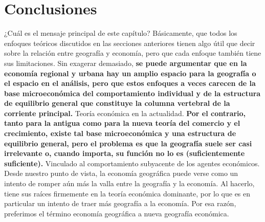 \section{Conclusiones}
¿Cuál es el mensaje principal de este capítulo? Básicamente, que todos los enfoques teóricos discutidos en las secciones anteriores tienen algo útil que decir sobre la relación entre geografía y economía, pero que cada enfoque también tiene sus limitaciones. Sin exagerar demasiado, \textbf{se puede argumentar que en la economía regional y urbana hay un amplio espacio para la geografía o el espacio en el análisis, pero que estos enfoques a veces carecen de la base microeconómica del comportamiento individual y de la estructura de equilibrio general que constituye la columna vertebral de la corriente principal.} Teoría económica en la actualidad. \textbf{Por el contrario, tanto para la antigua como para la nueva teoría del comercio y el crecimiento, existe tal base microeconómica y una estructura de equilibrio general, pero el problema es que la geografía suele ser casi irrelevante o, cuando importa, su función no lo es (suficientemente suficiente).}  Vinculado al comportamiento subyacente de los agentes económicos. Desde nuestro punto de vista, la economía geográfica puede verse como un intento de romper aún más la valla entre la geografía y la economía. Al hacerlo, tiene sus raíces firmemente en la teoría económica dominante, por lo que es en particular un intento de traer más geografía a la economía. Por esa razón, preferimos el término economía geográfica a nueva geografía económica.\\


